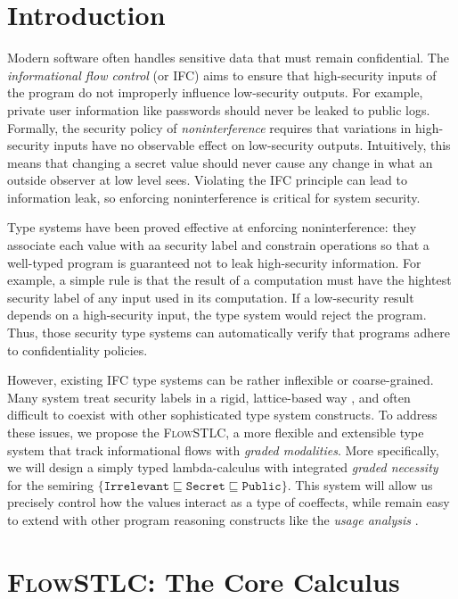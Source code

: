 \documentclass[conference]{IEEEtran}
\newcommand\public{\texttt{Public}}
\newcommand\secret{\texttt{Secret}}
\newcommand\irrele{\texttt{Irrelevant}}
\begin{document}
\section{Introduction}

Modern software often handles sensitive data that must remain confidential. The \emph{informational flow control} (or IFC) aims to ensure that high-security inputs of the program do not improperly influence low-security outputs. For example, private user information like passwords should never be leaked to public logs. Formally, the security policy of \emph{noninterference} requires that variations in high-security inputs have no observable effect on low-security outputs. Intuitively, this means that changing a secret value should never cause any change in what an outside observer at low level sees. Violating the IFC principle can lead to information leak, so enforcing noninterference is critical for system security.

Type systems \cite{sabelfeld2003language} have been proved effective at enforcing noninterference: they associate each value with aa security label and constrain operations so that a well-typed program is guaranteed not to leak high-security information. For example, a simple rule is that the result of a computation must have the hightest security label of any input used in its computation. If a low-security result depends on a high-security input, the type system would reject the program. Thus, those security type systems can automatically verify that programs adhere to confidentiality policies.

However, existing IFC type systems can be rather inflexible or coarse-grained. Many system treat security labels in a rigid, lattice-based way \cite{denning1976lattice}, and often difficult to coexist with other sophisticated type system constructs. To address these issues, we propose the \textsc{FlowSTLC}, a more flexible and extensible type system that track informational flows with \emph{graded modalities}. More specifically, we will design a simply typed lambda-calculus with integrated \emph{graded necessity} for the semiring $\{\irrele\sqsubseteq\secret\sqsubseteq\public\}$. This system will allow us precisely control how the values interact as a type of coeffects, while remain easy to extend with other program reasoning constructs like the \emph{usage analysis} \cite{orchard2019quantitative}.

\section{\textsc{FlowSTLC}: The Core Calculus}
\end{document}
